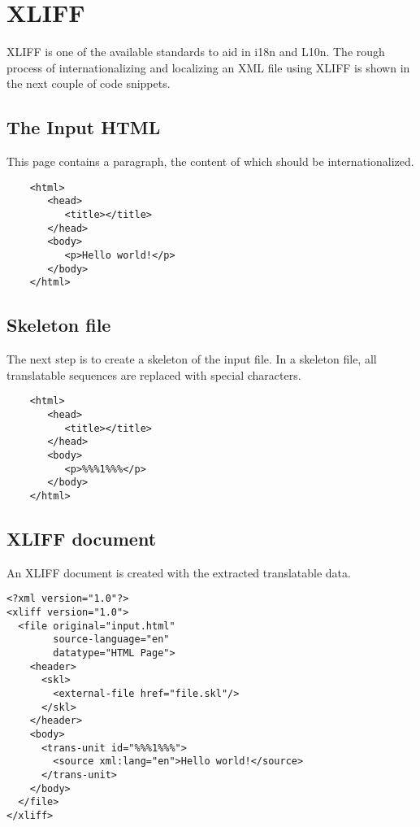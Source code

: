 \section{XLIFF}

 XLIFF is one of the available standards to aid in i18n and L10n. The rough process of internationalizing and localizing an XML file using XLIFF is shown in the next couple of code snippets. 

\subsection{The Input HTML}

This page contains a paragraph, the content of which should be internationalized.

\begin{verbatim}
    <html>
       <head>
          <title></title>
       </head>
       <body>
          <p>Hello world!</p>
       </body>
    </html>
\end{verbatim}

\subsection{Skeleton file}

The next step is to create a skeleton of the input file. In a skeleton file, all translatable sequences are replaced with special characters.

\begin{verbatim}
    <html>
       <head>
          <title></title>
       </head>
       <body>
          <p>%%%1%%%</p>
       </body>
    </html>
\end{verbatim}

\subsection{XLIFF document}

An XLIFF document is created with the extracted translatable data.

\begin{verbatim}
<?xml version="1.0"?>
<xliff version="1.0">
  <file original="input.html" 
        source-language="en" 
        datatype="HTML Page">
    <header>
      <skl>
        <external-file href="file.skl"/>
      </skl>
    </header>
    <body>
      <trans-unit id="%%%1%%%">
        <source xml:lang="en">Hello world!</source>
      </trans-unit>
    </body>
  </file>
</xliff>
\end{verbatim}

